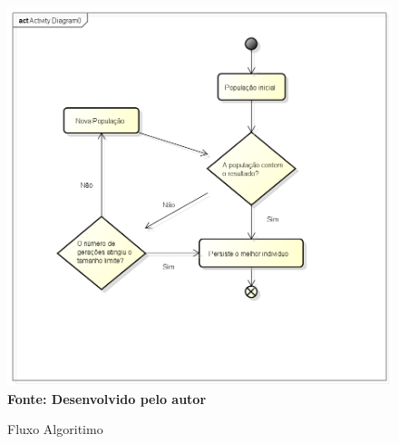 \documentclass{abntpuc}
\begin{document}
\begin{figure}[!htb]
\caption[Fluxo Algoritimo]{Fluxo Algoritimo}
\label{fig:figura8}
\centering
\includegraphics[scale=0.7]{imagens/fluxoAlgoritimo.png}
\\ \textbf{\footnotesize Fonte: Desenvolvido pelo autor}
\end{figure}



%

%
\end{document}
